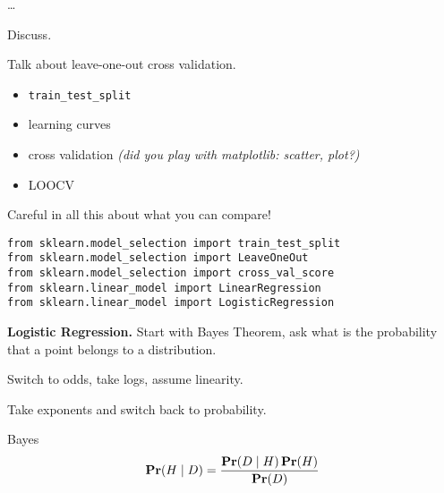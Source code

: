 
\usepackage{epsfig}
\usepackage{bbm}






\dots

Discuss.



Talk about leave-one-out cross validation.

\begin{itemize}
\item \texttt{train\_test\_split}
\item learning curves
\item cross validation \textit{(did you play with matplotlib: scatter,
  plot?)}
\item LOOCV
\end{itemize}

Careful in all this about what you can compare!

\begin{verbatim}
from sklearn.model_selection import train_test_split
from sklearn.model_selection import LeaveOneOut
from sklearn.model_selection import cross_val_score
from sklearn.linear_model import LinearRegression
from sklearn.linear_model import LogisticRegression
\end{verbatim}



\textbf{Logistic Regression.}  Start with Bayes Theorem, ask what is
the probability that a point belongs to a distribution.

Switch to odds, take logs, assume linearity.

Take exponents and switch back to probability.

\begin{theorem}{Bayes}
  \begin{displaymath}
    \mathbf{Pr}(H\mid D) = \frac{\mathbf{Pr}(D\mid H)\, \mathbf{Pr}(H)}{\mathbf{Pr}(D)}
  \end{displaymath}
\end{theorem}



